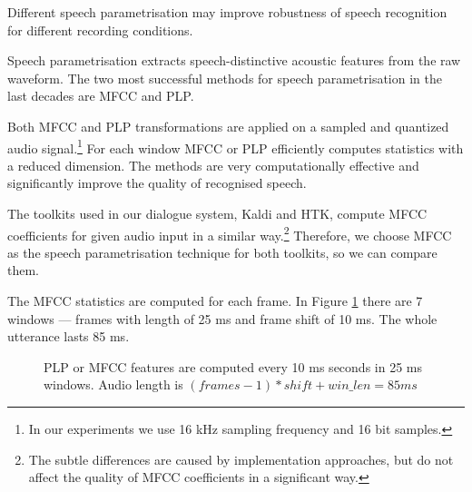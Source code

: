 Different speech parametrisation may improve robustness of speech recognition for different recording conditions. %


Speech parametrisation extracts speech-distinctive acoustic features from the raw waveform. The two most successful methods for speech parametrisation in the last decades are \ac{MFCC}\cite{davis1980comparison} and \ac{PLP}\cite{hermansky1990perceptual}.

Both \ac{MFCC} and \ac{PLP} transformations are applied on a sampled and quantized audio signal.\footnote{In our experiments we use 16 kHz sampling frequency and 16 bit samples.} For each window \ac{MFCC} or \ac{PLP} efficiently computes statistics with a reduced dimension. %
The methods are very computationally effective and significantly improve the quality of recognised speech.

The toolkits used in our dialogue system, Kaldi and \ac{HTK}, compute \ac{MFCC} coefficients for given audio input in a similar way.\footnote{The subtle differences are caused by implementation approaches, but do not affect the quality of \ac{MFCC} coefficients in a significant way.} Therefore, we choose \ac{MFCC} as the speech parametrisation technique for both toolkits, so we can compare them.


The \ac{MFCC} statistics are computed for each frame. In Figure \ref{fig:mfcc_window} there are 7 windows --- frames with length of 25 ms and frame shift of 10 ms. The whole utterance lasts 85 ms.

\begin{figure}[!htp]
  \begin{center}
    
    \caption{\ac{PLP} or \ac{MFCC} features are computed every 10 ms seconds in 25 ms windows.
      Audio length is $(frames-1)*shift + win\_len = 85ms$}
    \label{fig:mfcc_window} 
  \end{center}
\end{figure}

